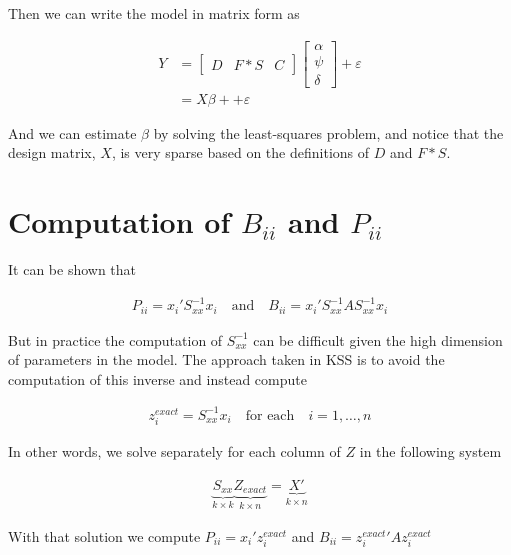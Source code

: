 \documentclass[12pt]{article}
\begin{document}
Then we can write the model in matrix form as

 \begin{align*}
     Y &= \begin{bmatrix} D & F*S & C \end{bmatrix} \begin{bmatrix} \alpha \\ \psi \\ \delta \end{bmatrix} + \varepsilon\\
     &= X \beta + + \varepsilon
\end{align*}
          
And we can estimate $\beta$ by solving the least-squares problem, and notice that the design matrix, $X$, is very sparse based on the definitions of $D$ and $F*S$.



\section{Computation of $B_{ii}$ and $P_{ii}$}

It can be shown that 

\begin{align*}
    P_{ii} = x_i' S_{xx}^{-1} x_i \quad \text{and} \quad B_{ii} = x_i' S_{xx}^{-1} A  S_{xx}^{-1} x_i
\end{align*}

\noindent But in practice the computation of $S_{xx}^{-1}$ can be difficult given the high dimension of parameters in the model. The approach taken in KSS is to avoid the computation of this inverse and instead compute 

\begin{align*}
    z_i^{exact} = S_{xx}^{-1} x_i \quad \text{for each} \quad i=1,\dots,n
\end{align*}

In other words, we solve separately for each column of $Z$ in the following system

\begin{align*}
    \underbrace{S_{xx}}_{k\times k} \underbrace{Z_{exact}}_{k\times n}  = \underbrace{X'}_{k\times n}
\end{align*}

\noindent With that solution we compute $P_{ii} = x_i' z_i^{exact}$ and $B_{ii} = {z_i^{exact}}' A z_i^{exact}$
\end{document}

